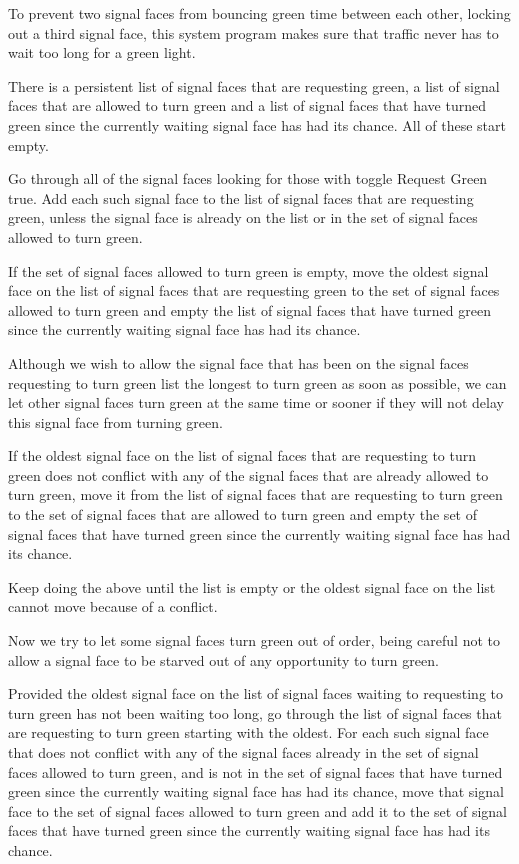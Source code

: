 \documentclass[letterpaper,twoside]{article}
\begin{document}
To prevent two signal faces from bouncing green time between each other,
locking out a third signal face, this system program makes sure that
traffic never has to wait too long for a green light.

There is a persistent list of signal faces that are requesting green,
a list of signal faces that are allowed to turn green and a list of signal
faces that have turned green since the currently waiting signal face
has had its chance.
All of these start empty.

Go through all of the signal faces looking for those with toggle Request
Green true.  Add each such signal face to the list of
signal faces that are requesting green, unless the signal face is already on
the list or in the set of signal faces allowed to turn green.

If the set of signal faces allowed to turn green is empty, move the
oldest signal face on the list of signal faces that are requesting
green to the set of signal faces allowed to turn green and empty the list
of signal faces that have turned green since the currently waiting
signal face has had its chance.

Although we wish to allow the signal face that has been on the
signal faces requesting to turn green list the longest to turn green
as soon as possible, we can let other signal faces turn green
at the same time or sooner if they will not delay this signal face
from turning green.

If the oldest signal face on the list of signal faces that are
requesting to turn green does not conflict with any of the signal
faces that are already allowed to turn green, move it from the
list of signal faces that are requesting to turn green to the set
of signal faces that are allowed to turn green and empty the set
of signal faces that have turned green since the currently waiting
signal face has had its chance.

Keep doing the above until the list is empty or the oldest signal
face on the list cannot move because of a conflict.

Now we try to let some signal faces turn green out of order, being
careful not to allow a signal face to be starved out of any
opportunity to turn green.

Provided the oldest signal face on the list of signal faces
waiting to requesting to turn green has not been waiting too long,
go through the list of signal faces that are requesting to turn green
starting with the oldest.  For each such signal face that does not
conflict with any of the signal faces already in the set of signal
faces allowed to turn green, and is not in the set of signal faces
that have turned green since the currently waiting signal face has
had its chance, move that signal face to the set of signal faces
allowed to turn green and add it to the set of signal faces that have
turned green since the currently waiting signal face has had its
chance.
\end{document}
